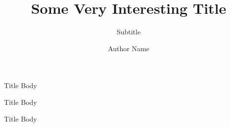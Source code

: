 \documentclass{ltx-talk}
\title{Some Very Interesting Title}
\subtitle{Subtitle}
\author{Author Name}
\institute{Cool Conference}
\begin{document}
\maketitle

\begin{frame}
  \begin{block}{Title}
    Body
  \end{block}
  \begin{alertblock}{Title}
    Body
  \end{alertblock}
  \begin{exampleblock}{Title}
    Body
  \end{exampleblock}
\end{frame}
\end{document}
